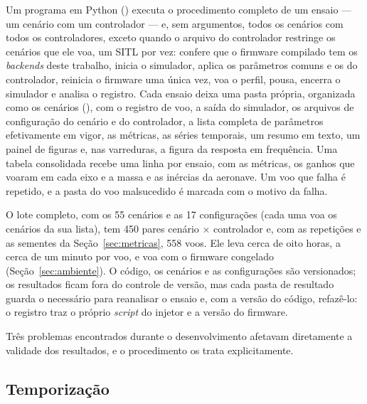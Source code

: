 Um programa em Python () executa o
procedimento completo de um ensaio --- um cenário com um controlador --- e,
sem argumentos, todos os cenários com todos os controladores, exceto quando o
arquivo do controlador restringe os cenários que ele voa, um SITL por vez:
confere que o firmware compilado tem os \textit{backends} deste trabalho,
inicia o simulador, aplica os parâmetros comuns e os do controlador,
reinicia o firmware uma única vez, voa o perfil, pousa, encerra o simulador e
analisa o registro. Cada ensaio deixa uma pasta própria, organizada como os
cenários (), com o
registro de voo, a saída do simulador, os arquivos de configuração do
cenário e do controlador, a lista completa de parâmetros efetivamente em
vigor, as métricas, as séries temporais, um resumo em texto, um painel de
figuras e, nas varreduras, a figura da resposta em frequência. Uma tabela
consolidada recebe uma linha por ensaio, com as métricas, os ganhos que
voaram em cada eixo e a massa e as inércias da aeronave. Um voo que falha é
repetido, e a pasta do voo malsucedido é marcada com o motivo da falha.

O lote completo, com os 55 cenários e as 17 configurações (cada uma voa os
cenários da sua lista), tem 450 pares cenário × controlador e, com as
repetições e as sementes da Seção~\ref{sec:metricas}, 558 voos. Ele leva
cerca de oito horas, a cerca de um minuto por voo, e voa com o firmware
congelado (Seção~\ref{sec:ambiente}). O código, os cenários e as configurações são
versionados; os resultados ficam fora do controle de versão, mas cada pasta
de resultado guarda o necessário para reanalisar o ensaio e, com a versão do
código, refazê-lo: o registro traz o próprio \textit{script} do injetor e a
versão do firmware.

Três problemas encontrados durante o desenvolvimento afetavam diretamente a
validade dos resultados, e o procedimento os trata explicitamente.

\subsection{Temporização}

